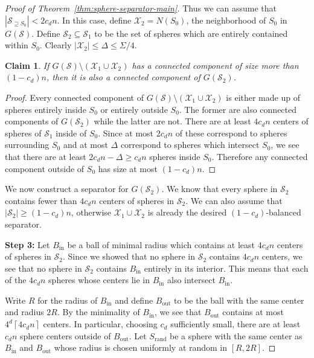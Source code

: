 \documentclass[10pt,a4paper]{amsart}
\newtheorem{claim}{Claim}
\newcommand{\ceil}[1]{\left\lceil #1 \right\rceil}
\newcommand{\fS}{\mathcal S}
\newcommand{\fX}{\mathcal X}
\begin{document}
\begin{proof}[Proof of Theorem~\ref{thm:sphere-separator-main}]
Thus we can assume that $|\fS_{\supseteq S_0}|< 2c_dn$. In this case, define $\fX_2=N(S_0)$, the neighborhood of $S_0$ in $G(\fS)$. Define $\fS_2\subseteq\fS_1$ to be the set of spheres which are entirely contained within $S_0$. Clearly $|\fX_2|\leq \Delta\leq\Sigma/4$.

\begin{claim}
\label{claim:sphere-separator-proof}
If $G(\fS)\setminus(\fX_1\cup \fX_2)$ has a connected component of size more than $(1-c_d)n$, then it is also a connected component of $G(\fS_2)$. 
\end{claim}
\begin{proof}
Every connected component of $G(\fS)\setminus (\fX_1\cup \fX_2)$ is either made up of spheres entirely inside $S_0$ or entirely outside $S_0$. The former are also connected components of $G(\fS_2)$ while the latter are not. There are at least $4c_dn$ centers of spheres of $\fS_1$ inside of $S_0$. Since at most $2c_dn$ of these correspond to spheres surrounding $S_0$ and at most $\Delta$ correspond to spheres which intersect $S_0$, we see that there are at least $2c_dn-\Delta\geq c_dn$ spheres inside $S_0$. Therefore any connected component outside of $S_0$ has size at most $(1-c_d)n$.
\end{proof}

We now construct a separator for $G(\fS_2)$. We know that every sphere in $\fS_2$ contains fewer than $4c_dn$ centers of spheres in $\fS_2$. We can also assume that $|\fS_2|\geq(1-c_d)n$, otherwise $\fX_1\cup\fX_2$ is already the desired $(1-c_d)$-balanced separator.

\vspace{5pt} \noindent \textbf{Step 3:} Let $B_{\mathrm{in}}$ be a ball of minimal radius which contains at least $4c_dn$ centers of spheres in $\fS_2$. Since we showed that no sphere in $\fS_2$ contains $4c_dn$ centers, we see that no sphere in $\fS_2$ contains $B_{\mathrm{in}}$ entirely in its interior. This means that each of the $4c_dn$ spheres whose centers lie in $B_{\mathrm{in}}$ also intersect $B_{\mathrm{in}}$.

Write $R$ for the radius of $B_{\mathrm{in}}$ and define $B_{\mathrm{out}}$ to be the ball with the same center and radius $2R$. By the minimality of $B_{\mathrm{in}}$, we see that $B_{\mathrm{out}}$ contains at most $4^d\ceil{4c_dn}$ centers. In particular, choosing $c_d$ sufficiently small, there are at least $c_dn$ sphere centers outside of $B_{\mathrm{out}}$. Let $S_{\mathrm{rand}}$ be a sphere with the same center as $B_{\mathrm{in}}$ and $B_{\mathrm{out}}$ whose radius is chosen uniformly at random in $[R,2R]$.


\end{proof}
\end{document}
